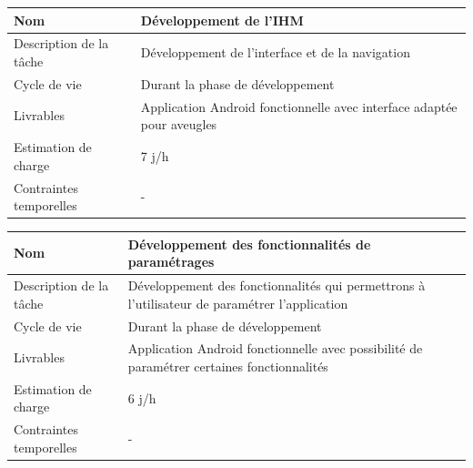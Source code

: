 \documentclass[CDS,UTF8,final]{EPURapport}
\begin{document}
\begin{table}[h!]
\centering
\begin{tabular}{|p{4cm}|p{10cm}|}
\hline
Nom                     & Développement de l'IHM                                                 \\ \hline
Description de la tâche & Développement de l'interface et de la navigation                       \\ \hline
Cycle de vie            & Durant la phase de développement                                       \\ \hline
Livrables               & Application Android fonctionnelle avec interface adaptée pour aveugles \\ \hline
Estimation de charge    & 7 j/h                                                                  \\ \hline
Contraintes temporelles & -                                                                      \\ \hline
\end{tabular}
\end{table}
\par

\begin{table}[h!]
\centering
\begin{tabular}{|p{4cm}|p{10cm}|}
\hline
Nom                     & Développement des fonctionnalités de paramétrages                                             \\ \hline
Description de la tâche & Développement des fonctionnalités qui permettrons à l'utilisateur de paramétrer l'application \\ \hline
Cycle de vie            & Durant la phase de développement                                                              \\ \hline
Livrables               & Application Android fonctionnelle avec possibilité de paramétrer certaines fonctionnalités    \\ \hline
Estimation de charge    & 6 j/h                                                                                         \\ \hline
Contraintes temporelles & -                                                                                             \\ \hline
\end{tabular}
\end{table}
\par
\end{document}
